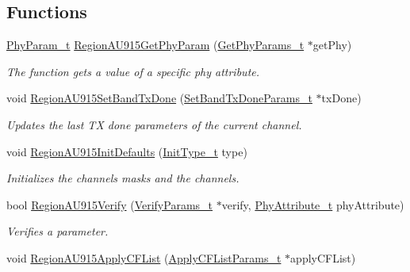 \subsection*{Functions}
\begin{DoxyCompactItemize}
\item 
\hyperlink{group__REGION_gaed159b26e5c4677236b6e8677019db30}{Phy\+Param\+\_\+t} \hyperlink{group__REGIONAU915_ga91322f6f4dc9d6155316edd4dc198830}{Region\+A\+U915\+Get\+Phy\+Param} (\hyperlink{group__REGION_gab471483fff904f4f89bbc03f7fc380ab}{Get\+Phy\+Params\+\_\+t} $\ast$get\+Phy)
\begin{DoxyCompactList}\small\item\em The function gets a value of a specific phy attribute. \end{DoxyCompactList}\item 
void \hyperlink{group__REGIONAU915_ga612ca919a6dcb846f32080a89d3824d7}{Region\+A\+U915\+Set\+Band\+Tx\+Done} (\hyperlink{group__REGION_gad0524aa0673c0814a71e7a4f9cade3fc}{Set\+Band\+Tx\+Done\+Params\+\_\+t} $\ast$tx\+Done)
\begin{DoxyCompactList}\small\item\em Updates the last TX done parameters of the current channel. \end{DoxyCompactList}\item 
void \hyperlink{group__REGIONAU915_gaf061a05f766feb06e67da3377638034a}{Region\+A\+U915\+Init\+Defaults} (\hyperlink{group__REGION_gaddc73ae10673ec925724e7870363bda9}{Init\+Type\+\_\+t} type)
\begin{DoxyCompactList}\small\item\em Initializes the channels masks and the channels. \end{DoxyCompactList}\item 
bool \hyperlink{group__REGIONAU915_ga728e3b1cdcd99b88a8c923c9fd0fd9a4}{Region\+A\+U915\+Verify} (\hyperlink{group__REGION_ga966d97bc2f25df1c09e92e60ef652276}{Verify\+Params\+\_\+t} $\ast$verify, \hyperlink{group__REGION_ga9445b07fdf77581ecfaf389970e635f8}{Phy\+Attribute\+\_\+t} phy\+Attribute)
\begin{DoxyCompactList}\small\item\em Verifies a parameter. \end{DoxyCompactList}\item 
void \hyperlink{group__REGIONAU915_ga4fd62616137cb73c9fc38f0854e6dad9}{Region\+A\+U915\+Apply\+C\+F\+List} (\hyperlink{group__REGION_ga71588e9ad07e34b78fa91d51881fd3c6}{Apply\+C\+F\+List\+Params\+\_\+t} $\ast$apply\+C\+F\+List)

\end{DoxyCompactItemize}
